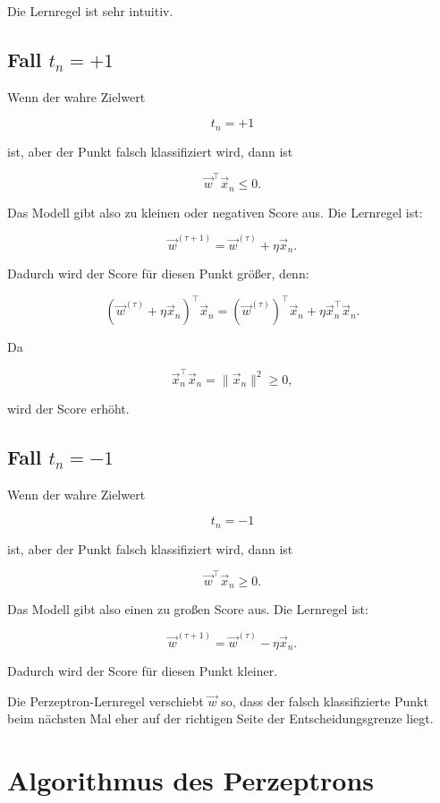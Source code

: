 Die Lernregel ist sehr intuitiv.

\subsection{Fall \(t_n=+1\)}

Wenn der wahre Zielwert

\[
    t_n=+1
\]

ist, aber der Punkt falsch klassifiziert wird, dann ist

\[
    \vec{w}^{\top}\vec{x}_n\leq 0.
\]

Das Modell gibt also zu kleinen oder negativen Score aus.
Die Lernregel ist:

\[
    \vec{w}^{(\tau+1)}
    =
    \vec{w}^{(\tau)}
    +
    \eta \vec{x}_n.
\]

Dadurch wird der Score für diesen Punkt größer, denn:

\[
    (\vec{w}^{(\tau)}+\eta\vec{x}_n)^{\top}\vec{x}_n
    =
    (\vec{w}^{(\tau)})^{\top}\vec{x}_n
    +
    \eta\vec{x}_n^{\top}\vec{x}_n.
\]

Da

\[
    \vec{x}_n^{\top}\vec{x}_n
    =
    \|\vec{x}_n\|^2
    \geq 0,
\]

wird der Score erhöht.

\subsection{Fall \(t_n=-1\)}

Wenn der wahre Zielwert

\[
    t_n=-1
\]

ist, aber der Punkt falsch klassifiziert wird, dann ist

\[
    \vec{w}^{\top}\vec{x}_n\geq 0.
\]

Das Modell gibt also einen zu großen Score aus.
Die Lernregel ist:

\[
    \vec{w}^{(\tau+1)}
    =
    \vec{w}^{(\tau)}
    -
    \eta \vec{x}_n.
\]

Dadurch wird der Score für diesen Punkt kleiner.

\begin{conceptbox}
Die Perzeptron-Lernregel verschiebt \(\vec{w}\) so, dass der falsch klassifizierte Punkt beim nächsten Mal eher auf der richtigen Seite der Entscheidungsgrenze liegt.
\end{conceptbox}

\section{Algorithmus des Perzeptrons}

